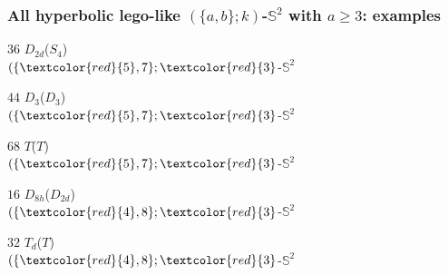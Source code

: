 \documentclass{beamer}
\begin{document}
\begin{frame}\frametitle {All hyperbolic lego-like   $(\{a,b\}; k)$-$\mathbb{S}^2$ with $a\ge 3$: examples}

\vspace{-3mm}
\tiny
\begin{center}
\begin{minipage}[b]{20mm}
\centering
\epsfig{height=20mm, file=
PDFdatabase/CASE\_g0\_k3\_n36\_-\_5\_16\_-\_7\_4/PLOT\_8\_PL\_1\_D2d\_8\_-\_1\_S4.pdf]}
\par $36$ $D_{2d}$($S_4$)\\
$(\{\textcolor{red}{5},7\}; \textcolor{red}{3}$-$\mathbb{S}^2$
 \end{minipage}
\begin{minipage}[b]{19mm}\centering
\epsfig{height=19mm, file=
PDFdatabase/CASE\_g0\_k3\_n44\_-\_5\_18\_-\_7\_6/PLOT\_9\_PL\_1\_D3\_9\_-\_1\_D3.pdf]}
\par $44$ $D_{3}$($D_3$) \\
$(\{\textcolor{red}{5},7\}; \textcolor{red}{3}$-$\mathbb{S}^2$
\end{minipage}
\begin{minipage}[b]{19mm}\centering
\epsfig{height=19mm, file=
PDFdatabase/CASE\_g0\_k3\_n68\_-\_5\_24\_-\_7\_12/PLOT\_4\_PL\_147\_T\_4\_-\_1\_T.pdf]}
\par $68$ $T$($T$)\\
$(\{\textcolor{red}{5},7\}; \textcolor{red}{3}$-$\mathbb{S}^2$
 \end{minipage}
\begin{minipage}[b]{19mm}\centering
\epsfig{height=19mm, file=
PDFdatabase/CASE\_g0\_k3\_n16\_-\_4\_8\_-\_8\_2/PLOT\_11\_PL\_2\_D8h\_11\_-\_1\_D2d.pdf]}
\par $16$ $D_{8h}$($D_{2d}$)\\
$(\{\textcolor{red}{4},8\}; \textcolor{red}{3}$-$\mathbb{S}^2$ \end{minipage}
\begin{minipage}[b]{19mm}\centering
\epsfig{height=19mm, file=
PDFdatabase/CASE\_g0\_k3\_n32\_-\_4\_12\_-\_8\_6/PLOT\_5\_PL\_20\_Td\_5\_-\_1\_T.pdf]}
\par $32$ $T_{d}$($T$)\\
$(\{\textcolor{red}{4},8\}; \textcolor{red}{3}$-$\mathbb{S}^2$\end{minipage}
\begin{minipage}[b]{20mm}\centering

\end{minipage}
\end{center}
\end{frame}
\end{document}
